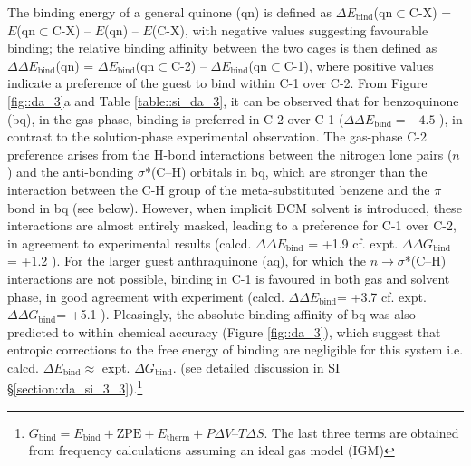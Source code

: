 \documentclass[../../main.tex]{subfiles}
\begin{document}
The binding energy of a general quinone (qn) is defined as $\Delta E_\text{bind}$(qn$\subset$C-X) = $E$(qn$\subset$C-X) – $E$(qn) – $E$(C-X), with negative values suggesting favourable binding; the relative binding affinity between the two cages is then defined as $\Delta\Delta E_\text{bind}$(qn) = $\Delta E_\text{bind}$(qn$\subset$C-2) – $\Delta E_\text{bind}$(qn$\subset$C-1), where positive values indicate a preference of the guest to bind within C-1 over C-2. From Figure \ref{fig::da_3}a and Table \ref{table::si_da_3}, it can be observed that for benzoquinone (bq), in the gas phase, binding is preferred in C-2 over C-1 ($\Delta\Delta E_\text{bind} = -4.5$ \kcal), in contrast to the solution-phase experimental observation. The gas-phase C-2 preference arises from the H-bond interactions between the nitrogen lone pairs ($n$) and the anti-bonding $\sigma$*(C–H) orbitals in bq, which are stronger than the interaction between the C-H group of the meta-substituted benzene and the $\pi$ bond in bq (see below). However, when implicit DCM solvent is introduced, these interactions are almost entirely masked, leading to a preference for C-1 over C-2, in agreement to experimental results (calcd. $\Delta\Delta E_\text{bind}$ = +1.9 \kcalx cf. expt.\cite{MartCentelles2018} $\Delta\Delta G_\text{bind}$ = +1.2 \kcal). For the larger guest anthraquinone (aq), for which the $n \rightarrow \sigma$*(C–H) interactions are not possible, binding in C-1 is favoured in both gas and solvent phase, in good agreement with experiment (calcd. $\Delta\Delta E_\text{bind}$= +3.7 \kcalx cf. expt. $\Delta\Delta G_\text{bind}$= +5.1 \kcal). Pleasingly, the absolute binding affinity of bq was also predicted to within chemical accuracy (Figure \ref{fig::da_3}), which suggest that entropic corrections to the free energy of binding are negligible for this system i.e. calcd. $\Delta E_\text{bind} \approx$ expt. $\Delta G_\text{bind}$. (see detailed discussion in SI §\ref{section::da_si_3_3}).\footnote{$G_\text{bind} = E_\text{bind}+\text{ZPE} + E_\text{therm}+P\Delta V–T \Delta S$. The last three terms are obtained from frequency calculations assuming an ideal gas model (IGM)} 
\end{document}
